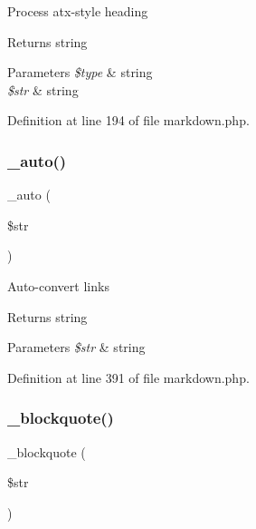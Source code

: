 Process atx-\/style heading \begin{DoxyReturn}{Returns}
string 
\end{DoxyReturn}

\begin{DoxyParams}{Parameters}
{\em \$type} & string \\
\hline
{\em \$str} & string \\
\hline
\end{DoxyParams}


Definition at line 194 of file markdown.\+php.

\hypertarget{class_markdown_ad228c71c9aae197fda9b32413b63e605}{}\label{class_markdown_ad228c71c9aae197fda9b32413b63e605} 
\subsubsection{\texorpdfstring{\+\_\+auto()}{\_auto()}}
{\footnotesize\ttfamily \+\_\+auto (\begin{DoxyParamCaption}\item[{}]{\$str }\end{DoxyParamCaption})\hspace{0.3cm}{\ttfamily [protected]}}

Auto-\/convert links \begin{DoxyReturn}{Returns}
string 
\end{DoxyReturn}

\begin{DoxyParams}{Parameters}
{\em \$str} & string \\
\hline
\end{DoxyParams}


Definition at line 391 of file markdown.\+php.

\hypertarget{class_markdown_a9130181ea7718ddb9a253c1c58709e62}{}\label{class_markdown_a9130181ea7718ddb9a253c1c58709e62} 
\subsubsection{\texorpdfstring{\+\_\+blockquote()}{\_blockquote()}}
{\footnotesize\ttfamily \+\_\+blockquote (\begin{DoxyParamCaption}\item[{}]{\$str }\end{DoxyParamCaption})\hspace{0.3cm}{\ttfamily [protected]}}

